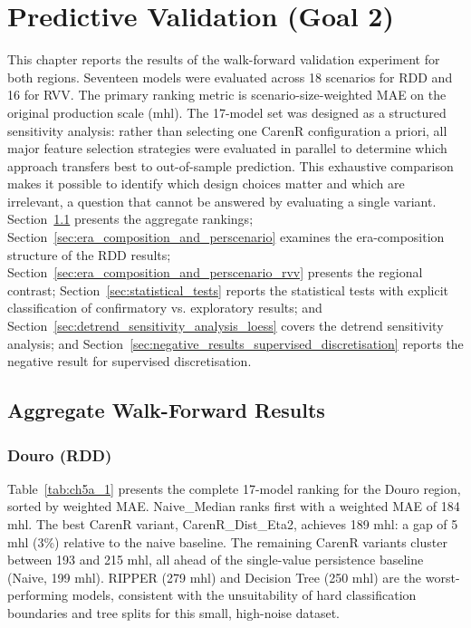 
\chapter{Predictive Validation (Goal 2)}\label{ch:goal_2_predictive_performance}

This chapter reports the results of the walk-forward validation experiment for both regions. Seventeen models were evaluated across 18 scenarios for RDD and 16 for RVV. The primary ranking metric is scenario-size-weighted MAE on the original production scale (mhl). The 17-model set was designed as a structured sensitivity analysis: rather than selecting one CarenR configuration a priori, all major feature selection strategies were evaluated in parallel to determine which approach transfers best to out-of-sample prediction. This exhaustive comparison makes it possible to identify which design choices matter and which are irrelevant, a question that cannot be answered by evaluating a single variant. Section~\ref{sec:aggregate_walkforward_results} presents the aggregate rankings; Section~\ref{sec:era_composition_and_perscenario} examines the era-composition structure of the RDD results; Section~\ref{sec:era_composition_and_perscenario_rvv} presents the regional contrast; Section~\ref{sec:statistical_tests} reports the statistical tests with explicit classification of confirmatory vs. exploratory results; and Section~\ref{sec:detrend_sensitivity_analysis_loess} covers the detrend sensitivity analysis; and Section~\ref{sec:negative_results_supervised_discretisation} reports the negative result for supervised discretisation.


\section{Aggregate Walk-Forward Results}\label{sec:aggregate_walkforward_results}


\subsection{Douro (RDD)}\label{sub:douro_rdd}

Table~\ref{tab:ch5a_1} presents the complete 17-model ranking for the Douro region, sorted by weighted MAE. Naive\_Median ranks first with a weighted MAE of 184 mhl. The best CarenR variant, CarenR\_Dist\_Eta2, achieves 189 mhl: a gap of 5 mhl (3\%) relative to the naive baseline. The remaining CarenR variants cluster between 193 and 215 mhl, all ahead of the single-value persistence baseline (Naive, 199 mhl). RIPPER (279 mhl) and Decision Tree (250 mhl) are the worst-performing models, consistent with the unsuitability of hard classification boundaries and tree splits for this small, high-noise dataset.

